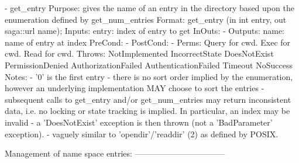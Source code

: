 \begin{myspec}
 
    - get_entry 
      Purpose:  gives the name of an entry in the directory
                based upon the enumeration defined by
                get_num_entries
      Format:   get_entry          (in  int       entry,
                                    out saga::url name);
      Inputs:   entry:              index of entry to get
      InOuts:   -
      Outputs:  name:               name of entry at index
      PreCond:  -
      PostCond: -
      Perms:    Query for cwd.
                Exec  for cwd.
                Read  for cwd.
      Throws:   NotImplemented
                IncorrectState
                DoesNotExist
                PermissionDenied
                AuthorizationFailed
                AuthenticationFailed
                Timeout
                NoSuccess
      Notes:    - '0' is the first entry
                - there is no sort order implied by the
                  enumeration, however an underlying
                  implementation MAY choose to sort the entries
                - subsequent calls to get_entry and/or
                  get_num_entries may return inconsistent data,
                  i.e. no locking or state tracking is implied.
                  In particular, an index may be invalid - a
                  'DoesNotExist' exception is then thrown (not a
                  'BadParameter' exception).
                - vaguely similar to 'opendir'/'readdir' (2) as
                  defined by POSIX.
 
 
    Management of name space entries:
    ---------------------------------
 

\end{myspec}
